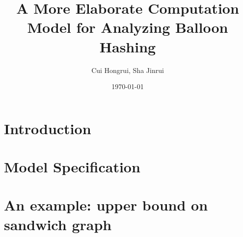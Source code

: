 \documentclass[a4paper, oneside]{article}
\author{Cui Hongrui, Sha Jinrui}
\title{A More Elaborate Computation Model for Analyzing Balloon Hashing}
\date{\today}
\begin{document}
\maketitle{}

\section{Introduction}\label{sec::intro}


\section{Model Specification}\label{sec::model}


\section{An example: upper bound on sandwich graph}\label{sec::sandwich}




\end{document}
